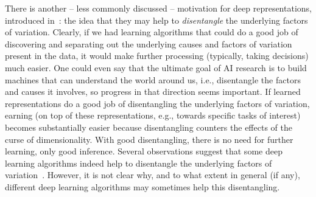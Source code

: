 There is another -- less commonly discussed -- motivation for deep
representations, introduced in~\citet{Bengio-2009}: the idea that they may
help to {\em disentangle} the underlying factors of
variation. Clearly, if we had learning algorithms that could do a good job
of discovering and separating out the underlying causes and factors of
variation present in the data, it would make further processing (typically,
taking decisions) much easier. One could even say that the ultimate goal of
AI research is to build machines that can understand the world around us,
i.e., disentangle the factors and causes it involves,
so progress in that direction seems important. If learned representations
do a good job of disentangling the underlying factors of variation,
earning (on top of these representations, e.g., towards
specific tasks of interest) becomes substantially easier because disentangling
counters the effects of the curse of dimensionality. With good disentangling,
there is no need for further learning, only good inference.
Several observations suggest that some deep learning
algorithms indeed help to disentangle the underlying factors of 
variation~\citep{Goodfellow2009,Glorot+al-ICML-2011}.
However, it is not clear why, and to what extent in general (if any),
different deep learning algorithms may sometimes help this disentangling.

